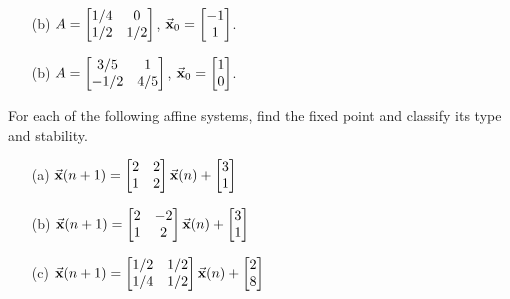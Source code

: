 \begin{exercises}
\begin{exercise}
\begin{enumerate}
\item[(b)]
$\displaystyle A  =  \begin{bmatrix}
              1/4 & 0 \\
              1/2 & 1/2
           \end{bmatrix}$, \hspace*{.25cm}
$\displaystyle \vec{\textbf{x}}_0 = \begin{bmatrix} -1 \\ 1 \end{bmatrix}$.
\item[(b)]
$\displaystyle A  =  \begin{bmatrix}
              3/5 & 1 \\
              -1/2 & 4/5
           \end{bmatrix}$, \hspace*{.25cm} 
$\displaystyle \vec{\textbf{x}}_0 = \begin{bmatrix} 1 \\ 0 \end{bmatrix}$.
\end{enumerate}
\end{exercise}

\begin{exercise}
For each of the following affine systems, find the
fixed point and classify its type and stability.
\begin{enumerate}
\item[(a)] $\displaystyle \vec{\textbf{x}}(n+1) = \begin{bmatrix}
                         2 & 2 \\
                         1 & 2
                     \end{bmatrix}
                        \vec{\textbf{x}}(n) + \begin{bmatrix} 3 \\ 1 \end{bmatrix}$
\item[(b)] $\displaystyle \vec{\textbf{x}}(n+1) = \begin{bmatrix}
                         2 & -2 \\
                         1 & 2
                     \end{bmatrix}
                        \vec{\textbf{x}}(n) + \begin{bmatrix} 3 \\ 1 \end{bmatrix}$
\item[(c)] $\displaystyle \vec{\textbf{x}}(n+1) = \begin{bmatrix}
                         1/2 & 1/2 \\
                         1/4 & 1/2
                     \end{bmatrix}
                        \vec{\textbf{x}}(n) + \begin{bmatrix} 2 \\ 8 \end{bmatrix}$
\end{enumerate}
\end{exercise}
\end{exercises}

